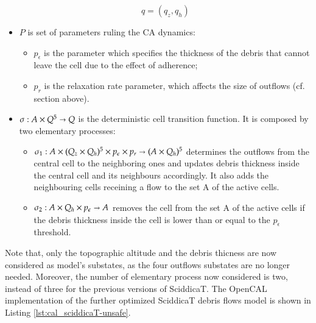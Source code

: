 \begin{itemize}
$$ q = (q_z, q_h)$$

\item   $P$ is set of parameters ruling the CA dynamics:

\begin{itemize}
    \item   $p_\epsilon$ is the parameter which specifies the thickness of the debris that cannot leave the cell due to the effect of adherence;
    \item   $p_r$ is the relaxation rate parameter, which affects the size of outflows (cf. section above).
\end{itemize}

\item $\sigma : A \times Q^5 \shortrightarrow Q$ is the deterministic cell
  transition function. It is composed by two elementary processes:
\begin{itemize}
\item $\sigma_1 : A \times (Q_z \times Q_h)^5 \times p_\epsilon \times
  p_r\shortrightarrow (A \times Q_h)^5$ determines the outflows from
  the central cell to the neighboring ones and updates debris
  thickness inside the central cell and its neighbours accordingly. It
  also adds the neighbouring cells receining a flow to the set A of the
  active cells.

\item $\sigma_2: A \times Q_h \times p_\epsilon \shortrightarrow A$ removes the
  cell from the set A of the active cells if the debris thickness
  inside the cell is lower than or equal to the $p_\epsilon$
  threshold.

\end{itemize}
\end{itemize}

Note that, only the topographic altitude and the debris thicness are
now considered as model's substates, as the four outflows substates
are no longer needed. Moreover, the number of elementary process now
considered is two, instead of three for the previous versions of
SciddicaT. The OpenCAL implementation of the further optimized
SciddicaT debris flows model is shown in Listing
\ref{lst:cal_sciddicaT-unsafe}.



